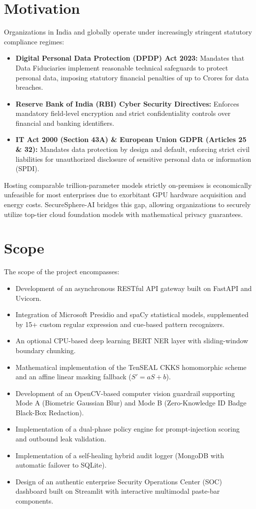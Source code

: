 \section{Motivation}
Organizations in India and globally operate under increasingly stringent statutory compliance regimes:
\begin{itemize}[leftmargin=*]
    \item \textbf{Digital Personal Data Protection (DPDP) Act 2023:} Mandates that Data Fiduciaries implement reasonable technical safeguards to protect personal data, imposing statutory financial penalties of up to  Crores for data breaches.
    \item \textbf{Reserve Bank of India (RBI) Cyber Security Directives:} Enforces mandatory field-level encryption and strict confidentiality controls over financial and banking identifiers.
    \item \textbf{IT Act 2000 (Section 43A) \& European Union GDPR (Articles 25 \& 32):} Mandates data protection by design and default, enforcing strict civil liabilities for unauthorized disclosure of sensitive personal data or information (SPDI).
\end{itemize}
Hosting comparable trillion-parameter models strictly on-premises is economically unfeasible for most enterprises due to exorbitant GPU hardware acquisition and energy costs. SecureSphere-AI bridges this gap, allowing organizations to securely utilize top-tier cloud foundation models with mathematical privacy guarantees.

\section{Scope}
The scope of the project encompasses:
\begin{itemize}[leftmargin=*]
    \item Development of an asynchronous RESTful API gateway built on FastAPI and Uvicorn.
    \item Integration of Microsoft Presidio and spaCy statistical models, supplemented by 15+ custom regular expression and cue-based pattern recognizers.
    \item An optional CPU-based deep learning BERT NER layer with sliding-window boundary chunking.
    \item Mathematical implementation of the TenSEAL CKKS homomorphic scheme and an affine linear masking fallback ($S' = aS + b$).
    \item Development of an OpenCV-based computer vision guardrail supporting Mode A (Biometric Gaussian Blur) and Mode B (Zero-Knowledge ID Badge Black-Box Redaction).
    \item Implementation of a dual-phase policy engine for prompt-injection scoring and outbound leak validation.
    \item Implementation of a self-healing hybrid audit logger (MongoDB with automatic failover to SQLite).
    \item Design of an authentic enterprise Security Operations Center (SOC) dashboard built on Streamlit with interactive multimodal paste-bar components.
\end{itemize}

